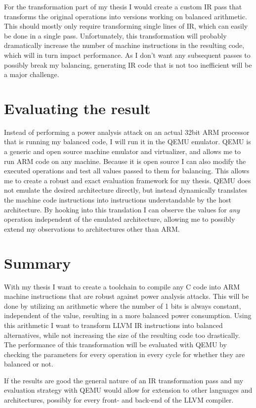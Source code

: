 \documentclass{article}
\newcommand{\qemu}{QEMU}
\begin{document}
For the transformation part of my thesis I would create a custom IR pass that transforms the original operations into versions working on balanced arithmetic.
This should mostly only require transforming single lines of IR, which can easily be done in a single pass.
Unfortunately, this transformation will probably dramatically increase the number of machine instructions in the resulting code, which will in turn impact performance.
As I don't want any subsequent passes to possibly break my balancing, generating IR code that is not too inefficient will be a major challenge.

\section{Evaluating the result}
\label{evaluation}
Instead of performing a power analysis attack on an actual 32bit ARM processor that is running my balanced code, I will run it in the \qemu{} emulator.
\qemu{} is a generic and open source machine emulator and virtualizer\cite{bellard2005qemu}, and allows me to run ARM code on any machine.
Because it is open source I can also modify the executed operations and test all values passed to them for balancing.
This allows me to create a robust and exact evaluation framework for my thesis.
\qemu{} does not emulate the desired architecture directly, but instead dynamically translates the machine code instructions into instructions understandable by the host architecture.
By hooking into this translation I can observe the values for \emph{any} operation independent of the emulated architecture, allowing me to possibly extend my observations to architectures other than ARM.

\section{Summary}
With my thesis I want to create a toolchain to compile any C code into ARM machine instructions that are robust against power analysis attacks.
This will be done by utilizing an arithmetic where the number of 1 bits is always constant, independent of the value, resulting in a more balanced power consumption.
Using this arithmetic I want to transform LLVM IR instructions into balanced alternatives, while not increasing the size of the resulting code too drastically.
The performance of this transformation will be evaluated with \qemu{} by checking the parameters for every operation in every cycle for whether they are balanced or not.

If the results are good the general nature of an IR transformation pass and my evaluation strategy with \qemu{} would allow for extension to other languages and architectures, possibly for every front- and back-end of the LLVM compiler.



\end{document}
